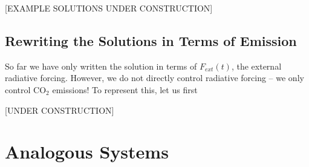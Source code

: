 [EXAMPLE SOLUTIONS UNDER CONSTRUCTION]

\subsection{Rewriting the Solutions in Terms of Emission}

So far we have only written the solution in terms of $F_{ext}(t)$, the external radiative forcing. However, we do not directly control radiative forcing – we only control CO$_2$ emissions! To represent this, let us first 

[UNDER CONSTRUCTION]

\section{Analogous Systems}

